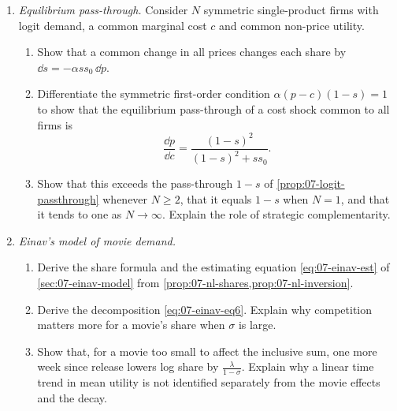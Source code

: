 \begin{enumerate}[label=\arabic*., leftmargin=*, itemsep=6pt]
\item \emph{Equilibrium pass-through.} Consider $N$ symmetric single-product firms with logit demand, a common
marginal cost $c$ and common non-price utility.
\begin{enumerate}[label=(\alph*)]
  \item Show that a common change in all prices changes each share by $\dd s = -\alpha s s_0\,\dd p$.
  \item Differentiate the symmetric first-order condition $\alpha(p - c)(1 - s) = 1$ to show that the
  equilibrium pass-through of a cost shock common to all firms is
  \begin{equation*}
    \frac{\dd p}{\dd c} = \frac{(1 - s)^2}{(1 - s)^2 + s s_0} .
  \end{equation*}
  \item Show that this exceeds the pass-through $1 - s$ of \cref{prop:07-logit-passthrough} whenever $N \ge 2$,
  that it equals $1 - s$ when $N = 1$, and that it tends to one as $N \to \infty$. Explain the role of strategic
  complementarity.
\end{enumerate}

\item \emph{Einav's model of movie demand.}
\begin{enumerate}[label=(\alph*)]
  \item Derive the share formula and the estimating equation \eqref{eq:07-einav-est} of \cref{sec:07-einav-model}
  from \cref{prop:07-nl-shares,prop:07-nl-inversion}.
  \item Derive the decomposition \eqref{eq:07-einav-eq6}. Explain why competition matters more for a movie's
  share when $\sigma$ is large.
  \item Show that, for a movie too small to affect the inclusive sum, one more week since release lowers log
  share by $\frac{\lambda}{1 - \sigma}$. Explain why a linear time trend in mean utility is not identified
  separately from the movie effects and the decay.
\end{enumerate}


\end{enumerate}
